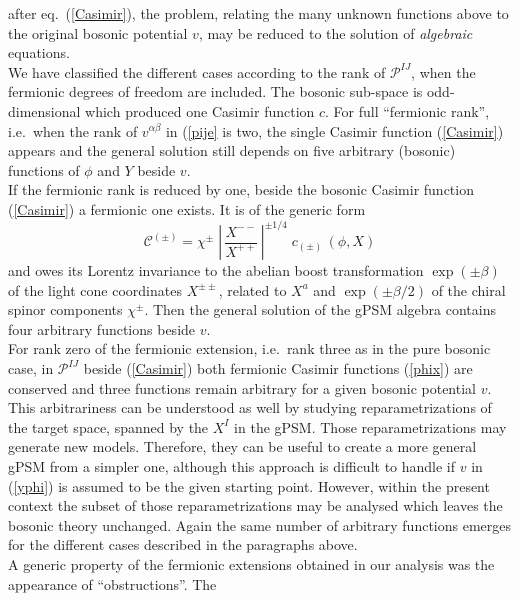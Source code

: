 \documentclass[a4paper,10pt]{article}
\renewcommand{\^}{{}^}
\renewcommand{\_}{\!{}_}
\begin{document}
after eq.\ (\ref{Casimir}), the problem, relating the many unknown 
functions above to the original bosonic potential $v$, may be 
reduced to the solution of \textit{algebraic} equations.\\
We have classified the different cases according to the rank 
of $\mathcal{P}^{IJ}$, when the fermionic degrees of freedom 
are included. The bosonic sub-space is odd-dimensional which 
produced one Casimir function $c$. 
For full ``fermionic rank'', i.e.\ when  
the rank of $v^{\alpha\beta}$ in (\ref{pije} 
is two, the single Casimir function 
(\ref{Casimir}) appears  and the general solution still depends on 
five  
arbitrary (bosonic) functions of $\phi$ and $Y$ beside $v$. 
\\
If the fermionic rank is reduced by one, beside the bosonic 
Casimir function (\ref{Casimir}) a fermionic one exists. It is of the 
generic form 
\begin{equation}
\label{phix}
\mathcal{C}^{(\pm)} = 
\chi^\pm \; \left\vert\, 
\frac{X^{--}}{X^{++}}\,\right\vert^{\pm 1/4}\; 
c_{(\pm)}\, (\phi, X)
\end{equation}
and owes its Lorentz invariance to the abelian boost 
transformation $\exp (\pm \beta)$ of the light cone 
coordinates $X^{\pm\pm}$, related to $X^a$ and $\exp (\pm 
\beta/2)$ of the chiral spinor components $\chi^{\pm}$. Then 
the general solution of the gPSM algebra 
contains four arbitrary functions beside $v$.\\
For rank zero of the fermionic extension, i.e.\ rank three as in 
the pure bosonic case, in $\mathcal{P}^{IJ}$ beside 
(\ref{Casimir}) 
both fermionic Casimir functions (\ref{phix}) are conserved and 
three functions remain arbitrary for a given bosonic 
potential $v$. \\
This arbitrariness can be understood as well 
by studying  
reparametrizations of the target space, spanned by the $X^I$ 
in the gPSM. Those reparametrizations may generate  new 
models. Therefore, they can be useful to create a more 
general gPSM from a simpler one, although this 
approach is 
difficult to handle if $v$ in (\ref{yphi}) is assumed to be 
the given 
starting point. However, within the present context the 
subset of those reparametrizations may be analysed which 
leaves the bosonic theory unchanged. Again the same number 
of arbitrary functions emerges for the different cases 
described in the paragraphs above. \\
A generic property of the fermionic extensions obtained in 
our analysis was the appearance of ``obstructions''. The 
\end{document}
